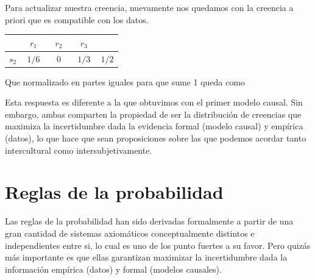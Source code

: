 \documentclass[a4paper,10pt]{book}
\theoremstyle{definition}
\begin{document}
Para actualizar nuestra creencia, nuevamente nos quedamos con la creencia a priori que es compatible con los datos.

\begin{table}[H]
\centering
 \begin{tabular}{c|c|c|c||c} \setlength\tabcolsep{0.4cm} 
        & \, $r_1$ \, &  \, $r_2$ \, & \, $r_3$ \, &  \\ \hline 
  $s_2$ & $1/6$ & $0$ & $1/3$ & $1/2$ \\ \hline
  \end{tabular}
\end{table}

Que normalizado en partes iguales para que sume 1 queda como

\begin{figure}[H]
\centering
{} 
\end{figure}
  
Esta respuesta es diferente a la que obtuvimos con el primer modelo causal.
Sin embargo, ambas comparten la propiedad de ser la distribución de creencias que maximiza la incertidumbre dada la evidencia formal (modelo causal) y empírica (datos), lo que hace que sean proposiciones sobre las que podemos acordar tanto intercultural como intersubjetivamente.

\section{Reglas de la probabilidad}

Las reglas de la probabilidad han sido derivadas formalmente a partir de una gran cantidad de sistemas axiomáticos conceptualmente distintos e independientes entre si, lo cual es uno de los punto fuertes a su favor.
Pero quizás más importante es que ellas garantizan maximizar la incertidumbre dada la información empírica (datos) y formal (modelos causales).
\end{document}
